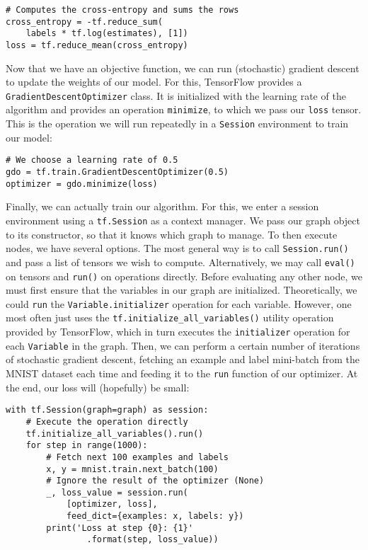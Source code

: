 \begin{lstlisting}
# Computes the cross-entropy and sums the rows
cross_entropy = -tf.reduce_sum(
    labels * tf.log(estimates), [1])
loss = tf.reduce_mean(cross_entropy)
\end{lstlisting}

Now that we have an objective function, we can run (stochastic) gradient descent
to update the weights of our model. For this, TensorFlow provides a
\texttt{GradientDescentOptimizer} class. It is initialized with the
learning rate of the algorithm and provides an operation \texttt{minimize}, to
which we pass our \texttt{loss} tensor. This is the operation we will run
repeatedly in a \texttt{Session} environment to train our model:

\begin{lstlisting}
# We choose a learning rate of 0.5
gdo = tf.train.GradientDescentOptimizer(0.5)
optimizer = gdo.minimize(loss)
\end{lstlisting}

Finally, we can actually train our algorithm. For this, we enter a session
environment using a \texttt{tf.Session} as a context manager. We pass our graph
object to its constructor, so that it knows which graph to manage. To then
execute nodes, we have several options. The most general way is to call
\texttt{Session.run()} and pass a list of tensors we wish to
compute. Alternatively, we may call \texttt{eval()} on tensors and
\texttt{run()} on operations directly. Before evaluating any other node, we must
first ensure that the variables in our graph are initialized. Theoretically, we
could \texttt{run} the \texttt{Variable.initializer} operation for each
variable. However, one most often just uses the
\texttt{tf.initialize\_all\_variables()} utility operation provided by
TensorFlow, which in turn executes the \texttt{initializer} operation for each
\texttt{Variable} in the graph. Then, we can perform a certain number of
iterations of stochastic gradient descent, fetching an example and label
mini-batch from the MNIST dataset each time and feeding it to the \texttt{run}
function of our optimizer. At the end, our loss will (hopefully) be small:

\begin{lstlisting}
with tf.Session(graph=graph) as session:
    # Execute the operation directly
    tf.initialize_all_variables().run()
    for step in range(1000):
        # Fetch next 100 examples and labels
        x, y = mnist.train.next_batch(100)
        # Ignore the result of the optimizer (None)
        _, loss_value = session.run(
            [optimizer, loss],
            feed_dict={examples: x, labels: y})
        print('Loss at step {0}: {1}'
                .format(step, loss_value))
\end{lstlisting}

